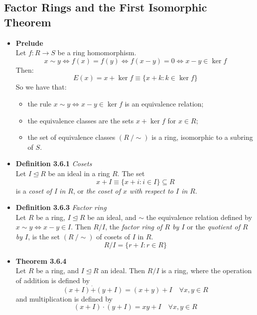 \documentclass[11pt,a4paper]{article}
\begin{document}
\subsection{Factor Rings and the First Isomorphic Theorem}

\begin{itemize}

    \item \textbf{Prelude} \\
        Let $f : R \to S$ be a ring homomorphism.
        \[
            x \sim y \iff f(x) = f(y) \iff f(x-y) = 0 \iff x - y \in \ker f
        \]
        Then:
        \[
            E(x) = x + \ker f \equiv \{x + k : k \in \ker f \}
        \]
        So we have that:
        \begin{itemize}
            \item the rule $x \sim y \iff x - y \in \ker f$ is an equivalence relation;
            \item the equivalence classes are the sets $x + \ker f$ for $x \in R$;
            \item the set of equivalence classes $(R \ / \sim)$ is a ring,
                isomorphic to a subring of $S$.
        \end{itemize}

    \item \textbf{Definition 3.6.1} \emph{Cosets} \\
        Let $I \trianglelefteq R$ be an ideal in a ring $R$.
        The set
        \[
            x+I \equiv \{x + i : i \in I\} \subseteq R
        \]
        is a \emph{coset of I in $R$}, or
        \emph{the coset of $x$ with respect to $I$ in $R$}.

    \item \textbf{Definition 3.6.3} \emph{Factor ring} \\
        Let $R$ be a ring, $I \trianglelefteq R$ be an ideal, and $\sim$ the equivalence
        relation defined by $x \sim y \iff x-y \in I$.
        Then $R/I$, the \emph{factor ring of $R$ by $I$} or the \emph{quotient of $R$ by $I$},
        is the set $(R \ / \sim)$ of cosets of $I$ in $R$.
        \[
            R/I = \{r + I : r \in R \}
        \]

    \item \textbf{Theorem 3.6.4} \\
        Let $R$ be a ring, and $I \trianglelefteq R$ an ideal.
        Then $R/I$ is a ring, where the operation of addition is defined by
        \[
            (x+I) \dot{+} (y+I) = (x+y) + I \quad \forall x,y \in R
        \]
        and multiplication is defined by
        \[
            (x+I) \cdot (y+I) = x y + I \quad \forall x,y \in R
        \]


\end{itemize}
\end{document}
